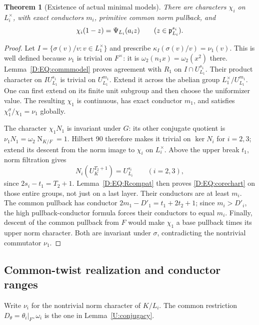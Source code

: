 \documentclass[11pt]{amsart}
\newtheorem{theorem}{Theorem}[section]
\theoremstyle{definition}
\theoremstyle{remark}
\newcommand{\Nm}{\operatorname{N}}
\begin{document}
\begin{theorem}[Existence of actual minimal models]\label{D:EQ:core-exists}
There are characters $\chi_i$ on $L_i^\times$, with exact conductors
$m_i$, primitive common norm pullback, and
\begin{equation}\label{D:EQ:corechart}
 \chi_i(1-z)=\Psi_{L_i}(a_i z)
                    \qquad(z\in\mathfrak p_{L_i}^{s_i}).
\end{equation}
\end{theorem}
\begin{proof}
Let $I=\{\sigma(v)/v:v\in L_1^\times\}$ and prescribe
$\kappa_I(\sigma(v)/v)=\nu_1(v)$. This is well defined because
$\nu_1$ is trivial on $F^\times$: it is $\omega_2(n_1x)=\omega_2(x^2)$
there. Lemma~\ref{D:EQ:commmodel} proves agreement with $R_1$ on
$I\cap U_{L_1}^{s_1}$. Their product character on
$I U_{L_1}^{s_1}$ is trivial on $U_{L_1}^{m_1}$.
Extend it across the abelian group $L_1^\times/U_{L_1}^{m_1}$.
One can first extend on its finite unit subgroup and then choose the
uniformizer value. The resulting $\chi_1$ is continuous, has exact
conductor $m_1$, and satisfies $\chi_1^\sigma/\chi_1=\nu_1$ globally.

The character $\chi_1N_1$ is invariant under $G$: its other conjugate
quotient is $\nu_1N_1=\omega_2\Nm_{K/F}=1$.
Hilbert 90 therefore makes it trivial on $\ker N_i$ for $i=2,3$;
extend its descent from the norm image to $\chi_i$ on $L_i^\times$.
Above the upper break $t_1$, norm filtration gives
\[
 N_i(U_K^{T_2+1})=U_{L_i}^{s_i}\qquad(i=2,3),
\]
since $2s_i-t_1=T_2+1$. Lemma~\ref{D:EQ:Rcompat} then proves
\eqref{D:EQ:corechart} on those entire groups, not just on a last layer.
Their conductors are at least $m_i$. The common pullback has conductor
$2m_1-D'_1=t_1+2t_2+1$; since $m_i>D'_i$, the high pullback-conductor
formula forces their conductors to equal $m_i$.
Finally, descent of the common pullback from $F$ would make $\chi_1$
a base pullback times its upper norm character. Both are invariant
under $\sigma$, contradicting the nontrivial commutator $\nu_1$.
\end{proof}

\subsection{Common-twist realization and conductor ranges}


Write $\nu_i$ for the nontrivial norm character of $K/L_i$.
The common restriction $D_\theta=\theta_i|_{F^\times}\omega_i$
is the one in Lemma~\ref{U:conjugacy}.
\end{document}
